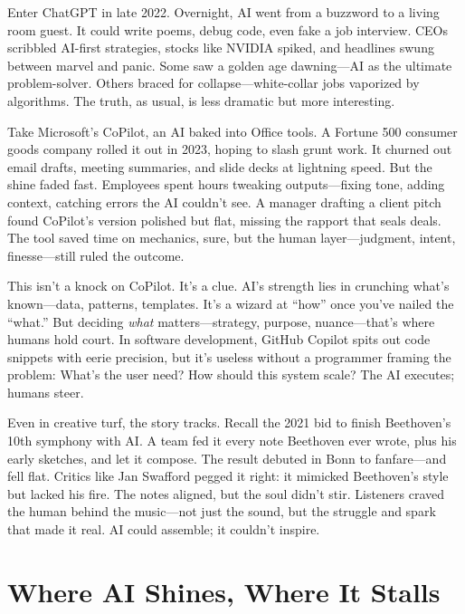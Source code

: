 \documentclass[
  Letterpaper,
]{scrbook}
\begin{document}
Enter ChatGPT in late 2022. Overnight, AI
went from a buzzword to a living room guest. It could write poems, debug
code, even fake a job interview. CEOs scribbled AI-first strategies,
stocks like NVIDIA spiked, and headlines swung between marvel and panic.
Some saw a golden age dawning---AI as the ultimate problem-solver.
Others braced for collapse---white-collar jobs vaporized by
algorithms. The truth, as usual, is less
dramatic but more interesting.

Take Microsoft's CoPilot, an AI baked into
Office tools. A Fortune 500 consumer goods company rolled it out in
2023, hoping to slash grunt work. It churned out email drafts, meeting
summaries, and slide decks at lightning speed. But the shine faded fast.
Employees spent hours tweaking outputs---fixing tone, adding context,
catching errors the AI couldn't see. A manager drafting a client pitch
found CoPilot's version polished but flat, missing the rapport that
seals deals. The tool saved time on mechanics, sure, but the human
layer---judgment, intent, finesse---still ruled the outcome.

This isn't a knock on CoPilot. It's a clue. AI's strength lies in
crunching what's known---data, patterns, templates. It's a wizard at
``how'' once you've nailed the ``what.'' But deciding \emph{what}
matters---strategy, purpose, nuance---that's where humans hold court. In
software development, GitHub Copilot spits
out code snippets with eerie precision, but it's useless without a
programmer framing the problem: What's the user need? How should this
system scale? The AI executes; humans steer.

Even in creative turf, the story tracks. Recall the 2021 bid to finish
Beethoven's 10th symphony with AI. A team fed it every
note Beethoven ever wrote, plus his early sketches, and let it compose.
The result debuted in Bonn to fanfare---and fell flat. Critics like Jan
Swafford pegged it right: it mimicked Beethoven's style but lacked his
fire. The notes aligned, but the soul didn't stir. Listeners craved the
human behind the music---not just the sound, but the struggle and spark
that made it real. AI could assemble; it couldn't inspire.

\section{Where AI Shines, Where It
Stalls}\label{where-ai-shines-where-it-stalls}
\end{document}
